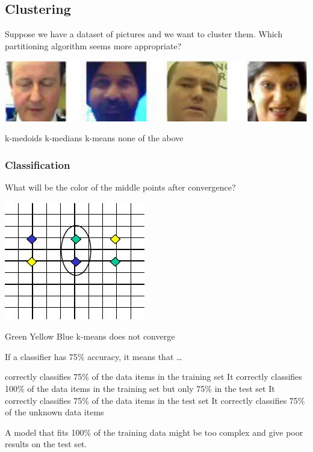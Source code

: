 \documentclass[12pt,a4paper,answers]{exam} %
\begin{document}
\begin{flushleft}
\begin{multicols*}{2}
\begin{questions}
\subsection{Clustering}
\question Suppose we have a dataset of pictures and we want to cluster them. Which partitioning algorithm seems more appropriate?
\begin{colfig}
\includegraphics[scale=0.3]{w11_s13}
\end{colfig}
\begin{checkboxes}
\choice k-medoids
\choice k-medians
\choice k-means
\CorrectChoice none of the above
\end{checkboxes}

\subsubsection{Classification}
% 
\question What will be the color of the middle points after convergence?
\begin{colfig}
\includegraphics[scale=0.3]{w11_s20}
\end{colfig}
\begin{checkboxes}
\choice Green
\choice Yellow
\choice Blue
\choice k-means does not converge
\end{checkboxes}

\question If a classifier has 75\% accuracy, it means that \ldots
\begin{checkboxes}
\choice correctly classifies 75\% of the data items in the training set
\choice It correctly classifies 100\% of the data items in the training set but only 75\% in the test set
\CorrectChoice It correctly classifies 75\% of the data items in the test set
\choice It correctly classifies 75\% of the unknown data items
\end{checkboxes}
\begin{solution}
A model that fits 100\% of the training data might be too complex and give poor results on the test set.
\end{solution}


\end{questions}
\end{multicols*}
\end{flushleft}
\end{document}
